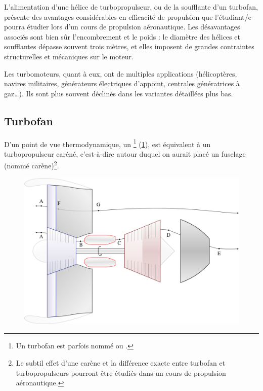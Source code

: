 {{		L’alimentation d’une hélice de turbopropulseur, ou de la soufflante d’un turbofan, présente des avantages considérables en efficacité de propulsion que l’étudiant/e pourra étudier lors d’un cours de propulsion aéronautique. Les désavantages associés sont bien sûr l’encombrement et le poids : le diamètre des hélices et soufflantes dépasse souvent trois mètres, et elles imposent de grandes contraintes structurelles et mécaniques sur le moteur.

		Les turbomoteurs, quant à eux, ont de multiples applications (hélicoptères, navires militaires, générateurs électriques d’appoint, centrales génératrices à gaz…). Ils sont plus souvent déclinés dans les variantes détaillées plus bas.

		 

	\subsection{Turbofan}

		D’un point de vue thermodynamique, un \footnote{Un turbofan est parfois nommé  ou .} (\cref{fig_turbofan}), est équivalent à un turbopropulseur caréné, c’est-à-dire autour duquel on aurait placé un fuselage (nommé carène)\footnote{Le subtil effet d’une carène et la différence exacte entre turbofan et turbopropulseurs pourront être étudiés dans un cours de propulsion aéronautique.}. 
		
		\begin{figure}
			\begin{center}
				\includegraphics[scale=0.6]{images/circuit_turbofan.png}
			\end{center}
			\label{fig_turbofan}
		\end{figure}
		
}}

